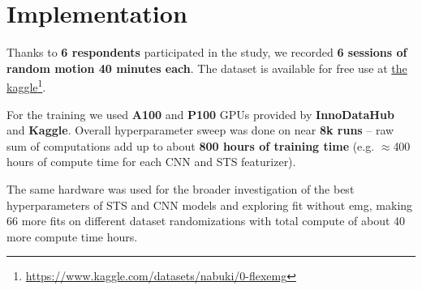 \chapter{Implementation}
\label{chap:impl}

Thanks to \textbf{6 respondents} participated in the study, we recorded \textbf{6 sessions of random motion 40 minutes each}. The dataset is available for free use at \href{https://www.kaggle.com/datasets/nabuki/0-flexemg}{the kaggle}\footnote{\url{https://www.kaggle.com/datasets/nabuki/0-flexemg}}.

For the training we used \textbf{A100} and \textbf{P100} GPUs provided by \textbf{InnoDataHub} and \textbf{Kaggle}. Overall hyperparameter sweep was done on near \textbf{8k runs} -- raw sum of computations add up to about \textbf{800 hours of training time} (e.g. $\approx$400 hours of compute time for each CNN and STS featurizer).

The same hardware was used for the broader investigation of the best hyperparameters of STS and CNN models and exploring fit without emg, making 66 more fits on different dataset randomizations with total compute of about 40 more compute time hours.